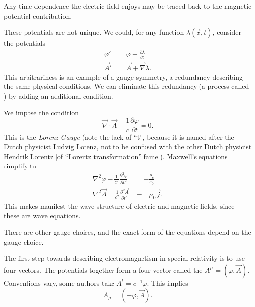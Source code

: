 \begin{remark}
Any time-dependence the electric field enjoys may be traced back to the
magnetic potential contribution.
\end{remark}

These potentials are not unique. We could, for any function
$\lambda(\vec{x},t)$, consider the potentials
\begin{subequations}
\begin{align}
\varphi' &= \varphi - \frac{\partial\lambda}{\partial t}\\
\vec{A}' &= \vec{A} + \vec{\nabla}\lambda.
\end{align}
\end{subequations}
This arbitrariness is an example of a gauge symmetry, a redundancy
describing the same physical conditions. We can eliminate this
redundancy (a process called ) by adding an
additional condition.

We impose the condition
\begin{equation}
\vec{\nabla}\cdot\vec{A} + \frac{1}{c}\frac{\partial\varphi}{\partial t}=0.
\end{equation}
This is the \emph{Lorenz Gauge} (note the lack of ``t'', because it is
named after the Dutch physicist Ludvig Lorenz, not to be confused with
the other Dutch physicist Hendrik Lorentz [of ``Lorentz transformation''
fame]). Maxwell's equations
simplify to 
\begin{subequations}
\begin{align}
\nabla^{2}\varphi - \frac{1}{c^{2}}\frac{\partial^{2}\varphi}{\partial t^{2}}
&= -\frac{\rho_{e}}{\varepsilon_{0}}\\
\nabla^{2}\vec{A} - \frac{1}{c^{2}}\frac{\partial^{2}\vec{A}}{\partial t^{2}}
&= -\mu_{0}\vec{j}.
\end{align}
\end{subequations}
This makes manifest the wave structure of electric and magnetic fields,
since these are wave equations.

\begin{remark}
There are other gauge choices, and the exact form of the equations
depend on the gauge choice.
\end{remark}

The first step towards describing electromagnetism in special relativity
is to use four-vectors. The potentials together form a four-vector
called the  $A^{\mu} = (\varphi, \vec{A})$.
Conventions vary, some authors take $A^{t}=c^{-1}\varphi$. This implies
\begin{equation}
A_{\mu} = (-\varphi, \vec{A}).
\end{equation}

